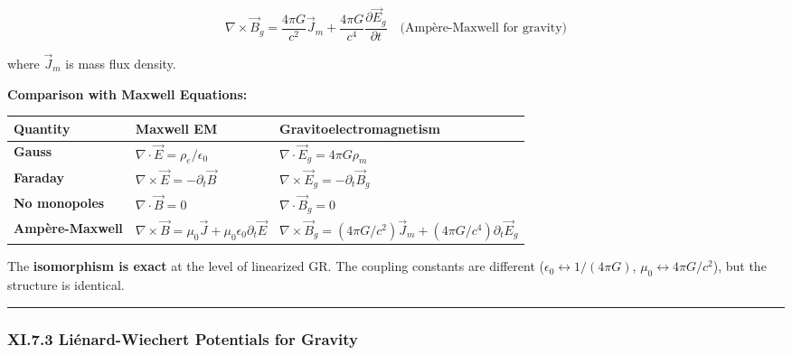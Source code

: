 \documentclass[
]{article}
\begin{document}
\[\nabla \times \vec{B}_g = \frac{4\pi G}{c^2} \vec{J}_m + \frac{4\pi G}{c^4} \frac{\partial \vec{E}_g}{\partial t} \quad \text{(Ampère-Maxwell for gravity)}\]

where \(\vec{J}_m\) is mass flux density.

\textbf{Comparison with Maxwell Equations:}

\begin{longtable}[]{@{}
  >{\raggedright\arraybackslash}p{}
  >{\raggedright\arraybackslash}p{}
  >{\raggedright\arraybackslash}p{}@{}}
\toprule\noalign{}
\begin{minipage}[b]{\linewidth}\raggedright
Quantity
\end{minipage} & \begin{minipage}[b]{\linewidth}\raggedright
Maxwell EM
\end{minipage} & \begin{minipage}[b]{\linewidth}\raggedright
Gravitoelectromagnetism
\end{minipage} \\
\midrule\noalign{}
\endhead
\bottomrule\noalign{}
\endlastfoot
\textbf{Gauss} & \(\nabla \cdot \vec{E} = \rho_e/\epsilon_0\) &
\(\nabla \cdot \vec{E}_g = 4\pi G \rho_m\) \\
\textbf{Faraday} & \(\nabla \times \vec{E} = -\partial_t \vec{B}\) &
\(\nabla \times \vec{E}_g = -\partial_t \vec{B}_g\) \\
\textbf{No monopoles} & \(\nabla \cdot \vec{B} = 0\) &
\(\nabla \cdot \vec{B}_g = 0\) \\
\textbf{Ampère-Maxwell} &
\(\nabla \times \vec{B} = \mu_0 \vec{J} + \mu_0\epsilon_0 \partial_t \vec{E}\)
&
\(\nabla \times \vec{B}_g = (4\pi G/c^2) \vec{J}_m + (4\pi G/c^4) \partial_t \vec{E}_g\) \\
\end{longtable}

The \textbf{isomorphism is exact} at the level of linearized GR. The
coupling constants are different
(\(\epsilon_0 \leftrightarrow 1/(4\pi G)\),
\(\mu_0 \leftrightarrow 4\pi G/c^2\)), but the structure is identical.

\begin{center}\rule{0.5\linewidth}{0.5pt}\end{center}

\subsubsection{XI.7.3 Liénard-Wiechert Potentials for
Gravity}\label{xi.7.3-liuxe9nard-wiechert-potentials-for-gravity}
\end{document}
